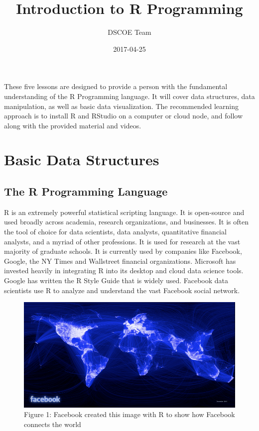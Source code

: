 \documentclass[]{book}
\title{Introduction to R Programming}
\author{DSCOE Team}
\date{2017-04-25}
\begin{document}
\maketitle

{
\setcounter{tocdepth}{1}
\tableofcontents
}
These five lessons are designed to provide a person with the fundamental
understanding of the R Programming language. It will cover data
structures, data manipulation, as well as basic data visualization. The
recommended learning approach is to install R and RStudio on a computer
or cloud node, and follow along with the provided material and videos.

\chapter{Basic Data Structures}\label{basic-data-structures}

\section{The R Programming Language}\label{the-r-programming-language}

R is an extremely powerful statistical scripting language. It is
open-source and used broadly across academia, research organizations,
and businesses. It is often the tool of choice for data scientists, data
analysts, quantitative financial analysts, and a myriad of other
professions. It is used for research at the vast majority of graduate
schools. It is currently used by companies like Facebook, Google, the NY
Times and Wallstreet financial organizations. Microsoft has invested
heavily in integrating R into its desktop and cloud data science tools.
Google has written the R Style Guide that is widely used. Facebook data
scientists use R to analyze and understand the vast Facebook social
network.

\begin{figure}[htbp]
\centering
\includegraphics{facebook.png}
\caption{Figure 1: Facebook created this image with R to show how
Facebook connects the world}
\end{figure}
\end{document}
